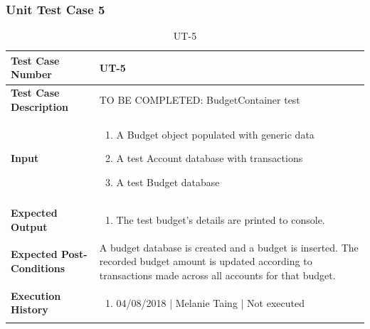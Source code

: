 \documentclass[12pt]{article}
\begin{document}
\subsubsection{Unit Test Case 5}
\def\arraystretch{1.5}%
\begin{table}[htbp]
\centering
\caption {UT-5}
\label{UT-5}
\begin{tabularx}{\textwidth}{ | l | X |}
\hline
\textbf{Test Case Number}      &  UT-5                         \\ \hline
\textbf{Test Case Description}    &  TO BE COMPLETED: BudgetContainer test                \\ \hline
\textbf{Input}         & 	\begin{enumerate}
	\item A Budget object populated with generic data
	\item A test Account database with transactions
	\item A test Budget database
\end{enumerate} \\ \hline

\textbf{Expected Output}     & \begin{enumerate}
	\item The test budget's details are printed to console.
\end{enumerate} \\ \hline
\textbf{Expected Post-Conditions}           & A budget database is created and a budget is inserted. The recorded budget amount is updated according to transactions made across all accounts for that budget.            \\ \hline
\textbf{Execution History}   &  \begin{enumerate}
	\item 04/08/2018 | Melanie Taing | Not executed
\end {enumerate} \\ \hline
\end{tabularx}
\end{table}
\clearpage

\end{document}
